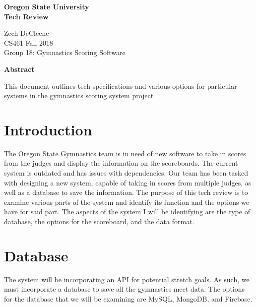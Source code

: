 \documentclass[letterpaper,10pt,draftclsnofoot,onecolumn,]{article}
\begin{document}
\begin{titlepage}
    \begin{center}
        \vspace*{1cm}
        \textbf{\huge Oregon State University}\\
        \vspace{1cm}
        \textbf{\LARGE Tech Review}
        
        \vspace{0.5cm}
        \Large Zech DeCleene \\
        \Large CS461 Fall 2018\\
        \Large Group 18: Gymnastics Scoring Software
         \vspace*{\fill}
        \begin{center}
            \textbf{\large{Abstract}}
        \end{center}
        \normalsize{This document outlines tech specifications and various options for particular systems in the gymnastics scoring system project}
        


    \end{center}
\end{titlepage}
\section*{Introduction}
    The Oregon State Gymnastics team is in need of new software to take in scores from the judges and display the information on the scoreboards. The current system is outdated and has issues with dependencies. Our team has been tasked with designing a new system, capable of taking in scores from multiple judges, as well as a database to save the information. The purpose of this tech review is to examine various parts of the system and identify its function and the options we have for said part. The aspects of the system I will be identifying are the type of database, the options for the scoreboard, and the data format.

\section{Database}
The system will be incorporating an API for potential stretch goals. As such, we must incorporate a database to save all the gymnastics meet data. The options for the database that we will be examining are MySQL, MongoDB, and Firebase. 
\end{document}
